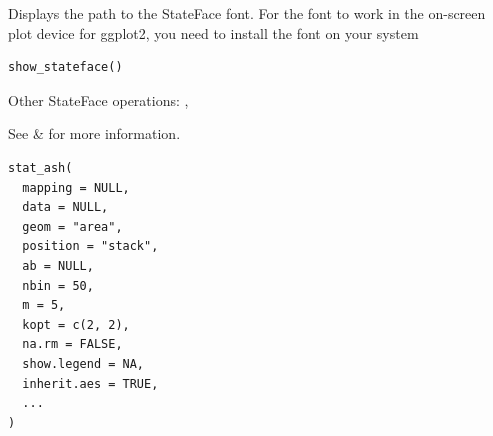 \documentclass[a4paper]{book}
\begin{document}
%
\begin{Description}
Displays the path to the StateFace font. For the font to work
in the on-screen plot device for ggplot2, you need to install
the font on your system
\end{Description}
%
\begin{Usage}
\begin{verbatim}
show_stateface()
\end{verbatim}
\end{Usage}
%
\begin{SeeAlso}
Other StateFace operations: 
,
\end{SeeAlso}
%
\begin{Description}
See  \&  for more information.
\end{Description}
%
\begin{Usage}
\begin{verbatim}
stat_ash(
  mapping = NULL,
  data = NULL,
  geom = "area",
  position = "stack",
  ab = NULL,
  nbin = 50,
  m = 5,
  kopt = c(2, 2),
  na.rm = FALSE,
  show.legend = NA,
  inherit.aes = TRUE,
  ...
)
\end{verbatim}
\end{Usage}
%
\end{document}
